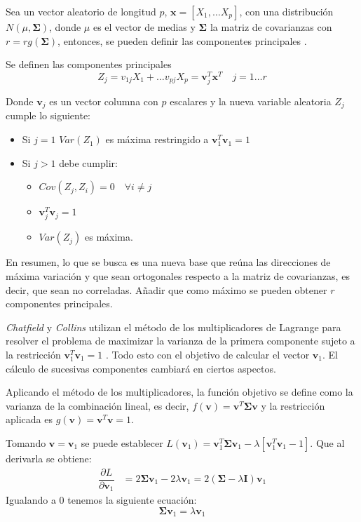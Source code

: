 \noindent Sea un vector aleatorio de longitud $p$, $\mathbf{x}=[X_1,\ldots X_p]$, con una distribución $N(\mu, \mathbf{\Sigma})$, donde $\mu$ es el vector de medias y $\mathbf{\Sigma}$ la matriz de covarianzas con $r=rg(\mathbf{\Sigma})$, entonces,  se pueden definir las componentes principales \cite{Cuadras 2014}.
\begin{defi}
Se definen las componentes principales 
\begin{equation}
Z_j=v_{1j}X_1+\ldots v_{pj}X_p=\mathbf{v}_j^T\mathbf{x}^T \quad j=1\ldots r
\end{equation}

\noindent Donde $\textbf{v}_j$ es un vector columna con $p$ escalares y la nueva variable aleatoria $Z_j$ cumple lo siguiente:
\begin{itemize}
\item Si $j=1$ $Var(Z_1)$ es máxima restringido a $\mathbf{v}_1^T \mathbf{v}_1=1$
\item Si $j>1$ debe cumplir:
\begin{itemize}
\item $Cov(Z_j,Z_i)=0\quad \forall i\neq j $
\item $\textbf{v}_j^T \textbf{v}_j=1$
\item $Var(Z_j)$ es máxima. 
\end{itemize}
\end{itemize}
\noindent En resumen, lo que se busca es una nueva base que reúna las direcciones de máxima variación y que sean ortogonales respecto a la matriz de covarianzas, es decir, que sean no correladas. Añadir que como máximo se pueden obtener $r$ componentes principales. 
\end{defi}
\noindent \emph{Chatfield} y \emph{Collins}  utilizan el método de los multiplicadores de Lagrange para resolver el problema de maximizar  la varianza de la primera componente sujeto a la restricción $\textbf{v}_1^T\textbf{v}_1=1$ \cite{Chatfield 1989}. Todo esto con el objetivo de calcular el vector $\mathbf{v}_1$. El cálculo de sucesivas componentes cambiará en ciertos aspectos. 

\noindent Aplicando el método de los multiplicadores, la función objetivo se define como la varianza de la combinación lineal, es decir, $f(\mathbf{v})=\mathbf{v}^T \mathbf{\Sigma} \mathbf{v}$ y la restricción aplicada es $g(\textbf{v})=\textbf{v}^T\textbf{v}=1$. 

\noindent Tomando $\mathbf{v}=\textbf{v}_1$ se puede establecer $L(\textbf{v}_1)=\textbf{v}_1^T \mathbf{\Sigma} \textbf{v}_1 - \lambda[\textbf{v}_1^T \textbf{v}_1-1]$. Que al derivarla se obtiene:
\begin{align*}
\dfrac{\partial L}{\partial \textbf{v}_1} &= 2\mathbf{\Sigma} \textbf{v}_1 - 2\lambda\textbf{v}_1= 2(\mathbf{\Sigma}-\lambda\mathbf{I})\textbf{v}_1 
\end{align*}
\noindent Igualando a 0 tenemos la siguiente ecuación: 
\begin{equation}
\mathbf{\Sigma}\textbf{v}_1=\lambda \textbf{v}_1
\end{equation}

